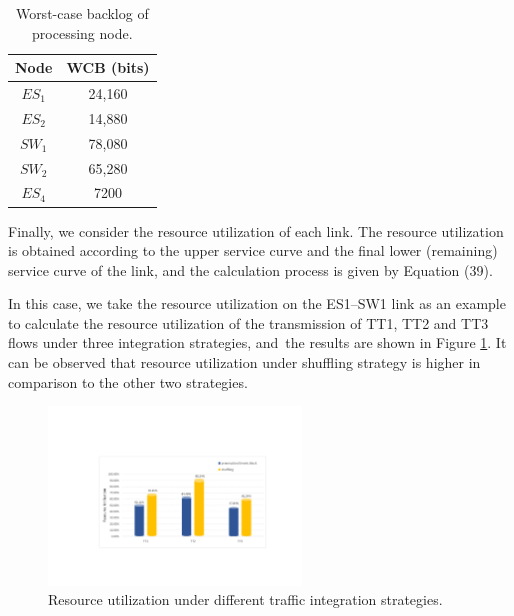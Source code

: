 \documentclass[electronics,article,accept,moreauthors,pdftex]{Definitions/mdpi}
\begin{document}

\begin{table}[H]
\centering
\caption{Worst-case backlog of processing node.}

\begin{tabular}{cc}
\toprule
\textbf{Node} & \textbf{WCB (bits)}\\
\midrule
$ES_1$ & 24,160\\
$ES_2$ & 14,880\\
$SW_1$ & 78,080\\
$SW_2$ & 65,280\\
$ES_4$ & 7200\\
\bottomrule
\end{tabular}
\label{tab3}
\end{table}


Finally, we consider the resource utilization of each link. The resource utilization is obtained according to the upper service curve and the final lower (remaining) service curve of the link, and the calculation process is given by Equation (39).

In this case, we take the resource utilization on the ES1--SW1 link as an example to calculate the resource utilization of the transmission of TT1, TT2 and TT3 flows under three integration strategies, and~the results are shown in {Figure} \ref{util}. It can be observed that resource utilization under shuffling strategy is higher in comparison to the other two strategies.

\begin{figure}[H]
\centering
\includegraphics[width=0.6\textwidth]{figures/utilization}
\caption{Resource utilization under different traffic integration strategies.}
\label{util}
\end{figure}
\end{document}
